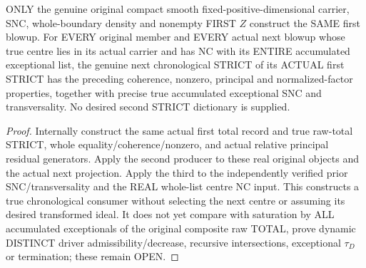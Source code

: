 \begin{theorem}
\label{hir:sharp-original-first-to-second-actual-chronological-strict}
\leanok
ONLY the genuine original compact smooth fixed-positive-dimensional carrier,
SNC, whole-boundary density and nonempty FIRST $Z$ construct the SAME first
blowup. For EVERY original member and EVERY actual next blowup whose true
centre lies in its actual carrier and has NC with its ENTIRE accumulated
exceptional list, the genuine next chronological STRICT of its ACTUAL first
STRICT has the preceding coherence, nonzero, principal and normalized-factor
properties, together with precise true accumulated exceptional SNC and
transversality. No desired second STRICT dictionary is supplied.
\end{theorem}
\begin{proof}
Internally construct the same actual first total record and true raw-total
STRICT, whole equality/coherence/nonzero, and actual relative principal
residual generators. Apply the second producer to these real original
objects and the actual next projection. Apply the third to the independently
verified prior SNC/transversality and the REAL whole-list centre NC input.
This constructs a true chronological consumer without selecting the next
centre or assuming its desired transformed ideal. It does not yet compare
with saturation by ALL accumulated exceptionals of the original composite
raw TOTAL, prove dynamic DISTINCT driver admissibility/decrease, recursive
intersections, exceptional $\tau_D$ or termination; these remain OPEN.
\end{proof}
